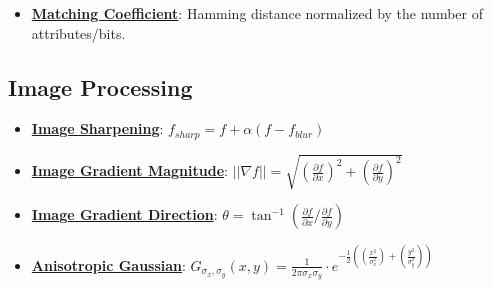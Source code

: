 \documentclass{article}%
\begin{document}
\begin{itemize}[leftmargin=*]
\item \href{https://purdue.brightspace.com/d2l/common/assets/pdfjs-d2l-dist/1.0.14-legacy/web/viewer.html?file=\%2Fcontent\%2Fenforced\%2F1095467-wl.202510.CS.24300.001\%2F12L2-distance-clusters.pdf\%3Fou\%3D1095467\&lang=en-us\&container=d2l-fileviewer-rendered-pdf\&fullscreen=d2l-fileviewer-rendered-pdf-dialog\&height=667#page=19}{\textbf{Matching Coefficient}}: Hamming distance normalized by the number of attributes/bits.%
\end{itemize}

%
\subsection{Image Processing}%
\label{subsec:ImageProcessing}%
\begin{itemize}[leftmargin=*]%
\item \href{https://purdue.brightspace.com/d2l/common/assets/pdfjs-d2l-dist/1.0.14-legacy/web/viewer.html?file=\%2Fcontent\%2Fenforced\%2F1095467-wl.202510.CS.24300.001\%2F07L2-Vision.pdf\%3Fou\%3D1095467\&lang=en-us\&container=d2l-fileviewer-rendered-pdf\&fullscreen=d2l-fileviewer-rendered-pdf-dialog\&height=667#page=55}{\textbf{Image Sharpening}}: $f_{sharp} = f + \alpha(f - f_{blur})$%
\item \href{https://purdue.brightspace.com/d2l/common/assets/pdfjs-d2l-dist/1.0.14-legacy/web/viewer.html?file=\%2Fcontent\%2Fenforced\%2F1095467-wl.202510.CS.24300.001\%2F08L2-Feature Extraction.pdf\%3Fou\%3D1095467\&lang=en-us\&container=d2l-fileviewer-rendered-pdf\&fullscreen=d2l-fileviewer-rendered-pdf-dialog\&height=667#page=17}{\textbf{Image Gradient Magnitude}}: $||\nabla f|| = \sqrt{(\frac{\partial f}{\partial x})^2 + (\frac{\partial f}{\partial y})^2}$%
\item \href{https://purdue.brightspace.com/d2l/common/assets/pdfjs-d2l-dist/1.0.14-legacy/web/viewer.html?file=\%2Fcontent\%2Fenforced\%2F1095467-wl.202510.CS.24300.001\%2F08L2-Feature Extraction.pdf\%3Fou\%3D1095467\&lang=en-us\&container=d2l-fileviewer-rendered-pdf\&fullscreen=d2l-fileviewer-rendered-pdf-dialog\&height=667#page=34}{\textbf{Image Gradient Direction}}: $\theta = \tan^{-1}(\frac{\partial f}{\partial x} / \frac{\partial f}{\partial y})$%
\item \href{https://purdue.brightspace.com/d2l/common/assets/pdfjs-d2l-dist/1.0.14-legacy/web/viewer.html?file=\%2Fcontent\%2Fenforced\%2F1095467-wl.202510.CS.24300.001\%2F08L2-Feature Extraction.pdf\%3Fou\%3D1095467\&lang=en-us\&container=d2l-fileviewer-rendered-pdf\&fullscreen=d2l-fileviewer-rendered-pdf-dialog\&height=667#page=43}{\textbf{Anisotropic Gaussian}}: $G_{\sigma_x, \sigma_y}(x, y) = \frac{1}{2\pi\sigma_x\sigma_y} \cdot e^{-\frac{1}{2}((\frac{x^2}{\sigma_x^2}) + (\frac{y^2}{\sigma_y^2}))}$%

\end{itemize}
\end{document}
